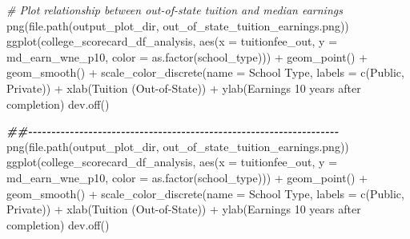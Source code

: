 \documentclass[
]{article}
\newenvironment{Shaded}{\begin{snugshade}}{\end{snugshade}}
\newcommand{\AttributeTok}[1]{\textcolor[rgb]{0.77,0.63,0.00}{#1}}
\newcommand{\CommentTok}[1]{\textcolor[rgb]{0.56,0.35,0.01}{\textit{#1}}}
\newcommand{\DocumentationTok}[1]{\textcolor[rgb]{0.56,0.35,0.01}{\textbf{\textit{#1}}}}
\newcommand{\FunctionTok}[1]{\textcolor[rgb]{0.00,0.00,0.00}{#1}}
\newcommand{\NormalTok}[1]{#1}
\newcommand{\SpecialCharTok}[1]{\textcolor[rgb]{0.00,0.00,0.00}{#1}}
\newcommand{\StringTok}[1]{\textcolor[rgb]{0.31,0.60,0.02}{#1}}
\begin{document}
\begin{Shaded}
\begin{Highlighting}[]
\CommentTok{\# Plot relationship between out{-}of{-}state tuition and median earnings}
\FunctionTok{png}\NormalTok{(}\FunctionTok{file.path}\NormalTok{(output\_plot\_dir, }\StringTok{\textquotesingle{}out\_of\_state\_tuition\_earnings.png\textquotesingle{}}\NormalTok{))}
\FunctionTok{ggplot}\NormalTok{(college\_scorecard\_df\_analysis, }\FunctionTok{aes}\NormalTok{(}\AttributeTok{x =}\NormalTok{ tuitionfee\_out, }\AttributeTok{y =}\NormalTok{ md\_earn\_wne\_p10, }\AttributeTok{color =} \FunctionTok{as.factor}\NormalTok{(school\_type))) }\SpecialCharTok{+}
  \FunctionTok{geom\_point}\NormalTok{() }\SpecialCharTok{+}
  \FunctionTok{geom\_smooth}\NormalTok{() }\SpecialCharTok{+}
  \FunctionTok{scale\_color\_discrete}\NormalTok{(}\AttributeTok{name =} \StringTok{\textquotesingle{}School Type\textquotesingle{}}\NormalTok{, }\AttributeTok{labels =} \FunctionTok{c}\NormalTok{(}\StringTok{\textquotesingle{}Public\textquotesingle{}}\NormalTok{, }\StringTok{\textquotesingle{}Private\textquotesingle{}}\NormalTok{)) }\SpecialCharTok{+}
  \FunctionTok{xlab}\NormalTok{(}\StringTok{\textquotesingle{}Tuition (Out{-}of{-}State)\textquotesingle{}}\NormalTok{) }\SpecialCharTok{+} \FunctionTok{ylab}\NormalTok{(}\StringTok{\textquotesingle{}Earnings 10 years after completion\textquotesingle{}}\NormalTok{)}
\FunctionTok{dev.off}\NormalTok{()}

\DocumentationTok{\#\#{-}{-}{-}{-}{-}{-}{-}{-}{-}{-}{-}{-}{-}{-}{-}{-}{-}{-}{-}{-}{-}{-}{-}{-}{-}{-}{-}{-}{-}{-}{-}{-}{-}{-}{-}{-}{-}{-}{-}{-}{-}{-}{-}{-}{-}{-}{-}{-}{-}{-}{-}{-}{-}{-}{-}{-}{-}{-}{-}{-}{-}{-}{-}{-}{-}{-}{-}}
\FunctionTok{png}\NormalTok{(}\FunctionTok{file.path}\NormalTok{(output\_plot\_dir, }\StringTok{\textquotesingle{}out\_of\_state\_tuition\_earnings.png\textquotesingle{}}\NormalTok{))}
\FunctionTok{ggplot}\NormalTok{(college\_scorecard\_df\_analysis, }\FunctionTok{aes}\NormalTok{(}\AttributeTok{x =}\NormalTok{ tuitionfee\_out, }\AttributeTok{y =}\NormalTok{ md\_earn\_wne\_p10, }\AttributeTok{color =} \FunctionTok{as.factor}\NormalTok{(school\_type))) }\SpecialCharTok{+}
  \FunctionTok{geom\_point}\NormalTok{() }\SpecialCharTok{+}
  \FunctionTok{geom\_smooth}\NormalTok{() }\SpecialCharTok{+}
  \FunctionTok{scale\_color\_discrete}\NormalTok{(}\AttributeTok{name =} \StringTok{\textquotesingle{}School Type\textquotesingle{}}\NormalTok{, }\AttributeTok{labels =} \FunctionTok{c}\NormalTok{(}\StringTok{\textquotesingle{}Public\textquotesingle{}}\NormalTok{, }\StringTok{\textquotesingle{}Private\textquotesingle{}}\NormalTok{)) }\SpecialCharTok{+}
  \FunctionTok{xlab}\NormalTok{(}\StringTok{\textquotesingle{}Tuition (Out{-}of{-}State)\textquotesingle{}}\NormalTok{) }\SpecialCharTok{+} \FunctionTok{ylab}\NormalTok{(}\StringTok{\textquotesingle{}Earnings 10 years after completion\textquotesingle{}}\NormalTok{)}
\FunctionTok{dev.off}\NormalTok{()}


\end{Highlighting}
\end{Shaded}
\end{document}
